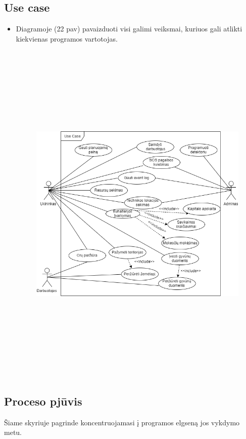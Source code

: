 \documentclass[oneside]{VUMIFPSkursinis}
\begin{document}
\subsection{Use case}
\begin{itemize}
\item Diagramoje (22 pav) pavaizduoti visi galimi veiksmai, kuriuos gali atlikti kiekvienas programos vartotojas.
		\begin{figure}[H]
		\centering	
	\includegraphics[width=15cm,height=17cm,keepaspectratio]{UseCaseFull.png}
	\caption{}
	\label{fig:UseCaseFull}
\end{figure}
\end{itemize}
\subsection{Proceso pjūvis}
Šiame skyriuje pagrinde koncentruojamasi į programos elgseną jos vykdymo metu.
\end{document}
